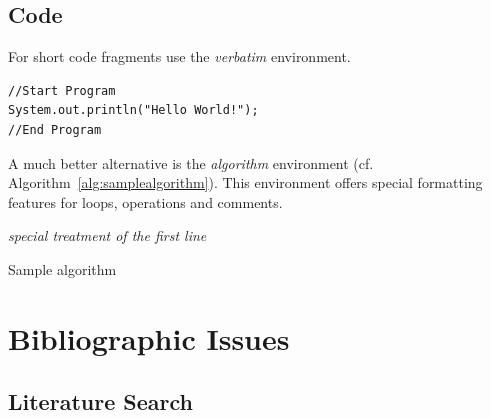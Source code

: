\documentclass{llncs}
\begin{document}
\subsection{Code}

For short code fragments use the \textit{verbatim} environment.

\begin{verbatim}
//Start Program
System.out.println("Hello World!");
//End Program
\end{verbatim}

A much better alternative is the \textit{algorithm} environment (cf. Algorithm~\ref{alg:samplealgorithm}). This environment offers special formatting features for loops, operations and comments.

\begin{algorithm}[t]


\BlankLine

\emph{special treatment of the first line}\;
\caption{Sample algorithm}\label{alg:samplealgorithm}
\end{algorithm}

\section{Bibliographic Issues}

\subsection{Literature Search}
\end{document}
